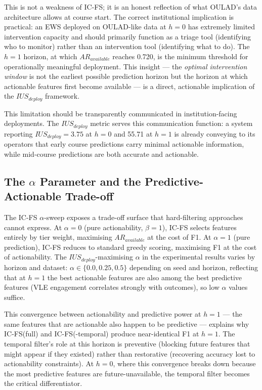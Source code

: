 \documentclass[a4paper,fleqn]{cas-sc}
\begin{document}
This is not a weakness of IC-FS; it is an honest reflection of what OULAD's data architecture allows at course start. The correct institutional implication is practical: an EWS deployed on OULAD-like data at $h=0$ has extremely limited intervention capacity and should primarily function as a triage tool (identifying who to monitor) rather than an intervention tool (identifying what to do). The $h=1$ horizon, at which $AR_{available}$ reaches 0.720, is the minimum threshold for operationally meaningful deployment. This insight --- the \textit{optimal intervention window} is not the earliest possible prediction horizon but the horizon at which actionable features first become available --- is a direct, actionable implication of the $IUS_{deploy}$ framework.

This limitation should be transparently communicated in institution-facing deployments. The $IUS_{deploy}$ metric serves this communication function: a system reporting $IUS_{deploy} = 3.75$ at $h=0$ and 55.71 at $h=1$ is already conveying to its operators that early course predictions carry minimal actionable information, while mid-course predictions are both accurate and actionable.

\subsection{The $\alpha$ Parameter and the Predictive-Actionable Trade-off}

The IC-FS $\alpha$-sweep exposes a trade-off surface that hard-filtering approaches cannot express. At $\alpha=0$ (pure actionability, $\beta=1$), IC-FS selects features entirely by tier weight, maximising $AR_{available}$ at the cost of F1. At $\alpha=1$ (pure prediction), IC-FS reduces to standard greedy scoring, maximising F1 at the cost of actionability. The $IUS_{deploy}$-maximising $\alpha$ in the experimental results varies by horizon and dataset: $\alpha \in \{0.0, 0.25, 0.5\}$ depending on seed and horizon, reflecting that at $h=1$ the best actionable features are also among the best predictive features (VLE engagement correlates strongly with outcomes), so low $\alpha$ values suffice.

This convergence between actionability and predictive power at $h=1$ --- the same features that are actionable also happen to be predictive --- explains why IC-FS(full) and IC-FS(-temporal) produce near-identical F1 at $h=1$. The temporal filter's role at this horizon is preventive (blocking future features that might appear if they existed) rather than restorative (recovering accuracy lost to actionability constraints). At $h=0$, where this convergence breaks down because the most predictive features are future-unavailable, the temporal filter becomes the critical differentiator.
\end{document}

